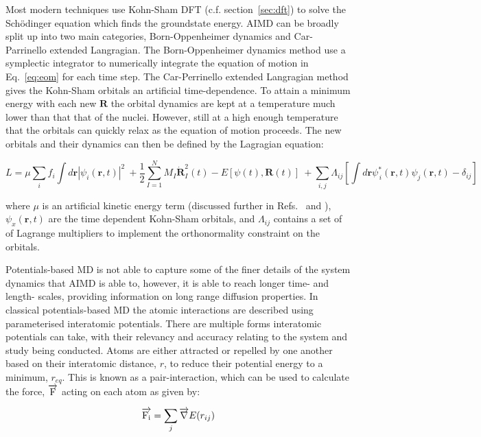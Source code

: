 \documentclass[../main.tex]{subfiles}
\begin{document}
Most modern techniques use Kohn-Sham DFT (c.f. section~\ref{sec:dft}) to solve the Sch\"{o}dinger equation which finds the groundstate energy. AIMD can be broadly split up into two main categories, Born-Oppenheimer dynamics and Car-Parrinello extended Langragian. The Born-Oppenheimer dynamics method use a symplectic integrator to numerically integrate the equation of motion in Eq.~\ref{eq:eom} for each time step. The Car-Perrinello extended Langragian method gives the Kohn-Sham orbitals an artificial time-dependence. To attain a minimum energy with each new $\textbf{R}$ the orbital dynamics are kept at a temperature much lower than that that of the nuclei. However, still at a high enough temperature that the orbitals can quickly relax as the equation of motion proceeds. The new orbitals and their dynamics can then be defined by the Lagragian equation:\cite{Car1985}

\begin{equation}
    L=\mu \sum_i f_i \int d\textbf{r}|\psi_i(\textbf{r},t)|^2 \
    +\frac{1}{2}\sum^N_{I=1} M_I\dot{\textbf{R}}^2_I (t)- E\left[{\psi(t)}, \textbf{R}(t)\right] \
    +\sum_{i,j} \Lambda_{ij}\left[\int d\textbf{r}\psi^*_{\,i}(\textbf{r},t)\psi_j(\textbf{r}, t)- \delta_{ij}\right]
\end{equation}

where $\mu$ is an artificial kinetic energy term (discussed further in Refs.~ and ), $\psi_x(\textbf{r},t)$ are the time dependent Kohn-Sham orbitals, and $\Lambda_{ij}$ contains a set of of Lagrange multipliers to implement the orthonormality constraint on the orbitals. 

Potentials-based MD is not able to capture some of the finer details of the system dynamics that AIMD is able to, however, it is able to reach longer time- and length- scales, providing information on long range diffusion properties. In classical potentials-based MD the atomic interactions are described using parameterised interatomic potentials. There are multiple forms interatomic potentials can take, with their relevancy and accuracy relating to the system and study being conducted. Atoms are either attracted or repelled by one another based on their interatomic distance, $r$, to reduce their potential energy to a minimum, $r_{eq}$. This is known as a pair-interaction, which can be used to calculate the force, $\overrightarrow{\rm F}$ acting on each atom as given by:

\begin{equation}
    \overrightarrow{\rm F_i} = \sum_j {\overrightarrow{\nabla}}E(r_{ij})
\end{equation}
\end{document}
